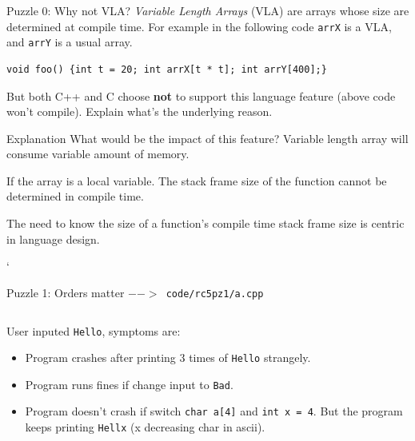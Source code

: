 \begin{frame}[fragile]{Puzzle 0: Why not VLA?}
\textit{Variable Length Arrays} (VLA) are arrays whose size are determined at compile time. For example in the following code \texttt{arrX} is a VLA, and \texttt{arrY} is a usual array.
\begin{verbatim}
void foo() {int t = 20; int arrX[t * t]; int arrY[400];}
\end{verbatim}
But both C++ and C choose \textbf{not} to support this language feature (above code won't compile). Explain what's the underlying reason.

\pause
\begin{block}{Explanation}
What would be the impact of this feature? Variable length array will consume variable amount of memory.

If the array is a local variable. The stack frame size of the function cannot be determined in compile time. 

The need to know the size of a function's compile time stack frame size is centric in language design. 
\end{block}      `
\end{frame}

\begin{frame}[fragile]{Puzzle 1: Orders matter}
\texttt{$-->$ code/rc5pz1/a.cpp}
\inputminted{c++}{code/rc5pz1/a.cpp}
User inputed \texttt{Hello}, symptoms are:
\begin{itemize}
	\item Program crashes after printing 3 times of \texttt{Hello} strangely.
	\item Program runs fines if change input to \texttt{Bad}.
	\item Program doesn't crash if switch \texttt{char a[4]} and \texttt{int x = 4}. But the program keeps printing \texttt{Hellx} (x decreasing char in ascii).
\end{itemize}
\end{frame}

